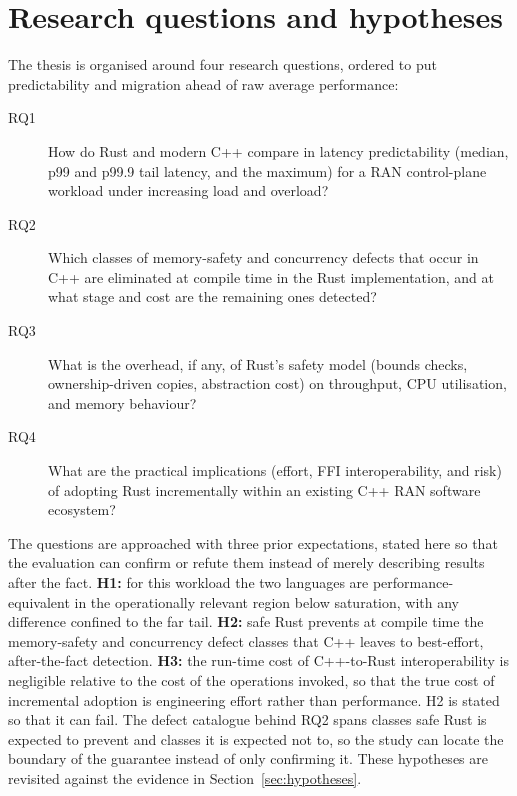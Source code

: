 \documentclass[english,oneside,a4paper,censored,csm,software-track-2020]{HYthesisML}
\begin{document}
\section{Research questions and hypotheses}\label{sec:rqs}
The thesis is organised around four research questions, ordered to put predictability and
migration ahead of raw average performance:

\begin{description}
  \item[RQ1] How do Rust and modern C++ compare in latency predictability (median, p99
        and p99.9 tail latency, and the maximum) for a RAN control-plane workload under
        increasing load and overload?
  \item[RQ2] Which classes of memory-safety and concurrency defects that occur in C++ are
        eliminated at compile time in the Rust implementation, and at what stage and cost
        are the remaining ones detected?
  \item[RQ3] What is the overhead, if any, of Rust's safety model (bounds checks,
        ownership-driven copies, abstraction cost) on throughput, CPU utilisation, and
        memory behaviour?
  \item[RQ4] What are the practical implications (effort, FFI interoperability, and risk)
        of adopting Rust incrementally within an existing C++ RAN software ecosystem?
\end{description}

The questions are approached with three prior expectations, stated here so that the evaluation
can confirm or refute them instead of merely describing results after the fact. \textbf{H1:} for
this workload the two languages are performance-equivalent in the operationally relevant region
below saturation, with any difference confined to the far tail. \textbf{H2:} safe Rust prevents
at compile time the memory-safety and concurrency defect classes that C++ leaves to
best-effort, after-the-fact detection. \textbf{H3:} the run-time cost of C++-to-Rust
interoperability is negligible relative to the cost of the operations invoked, so that the true
cost of incremental adoption is engineering effort rather than performance. H2 is stated so that
it can fail. The defect catalogue behind RQ2 spans classes safe Rust is expected to prevent and
classes it is expected not to, so the study can locate the boundary of the guarantee instead of
only confirming it. These hypotheses are revisited against the evidence in
Section~\ref{sec:hypotheses}.
\end{document}
